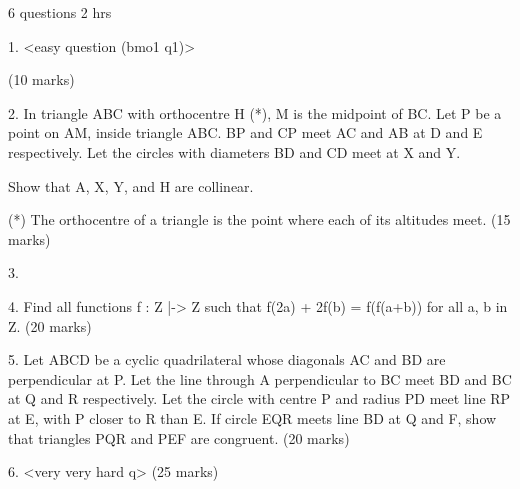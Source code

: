 6 questions
2 hrs


1. <easy question (bmo1 q1)>

(10 marks)




2.
In triangle ABC with orthocentre H (*), M is the midpoint of BC. Let P be a point on AM, inside triangle ABC.
BP and CP meet AC and AB at D and E respectively. Let the circles with diameters BD and CD meet at X and Y.

Show that A, X, Y, and H are collinear.

(*) The orthocentre of a triangle is the point where each of its altitudes meet.
(15 marks)



3.




4.
Find all functions f : Z |-> Z such that
f(2a) + 2f(b) = f(f(a+b))
for all a, b in Z.
(20 marks)



5.
Let ABCD be a cyclic quadrilateral whose diagonals AC and BD are perpendicular at P. Let the line through A perpendicular to BC meet BD and BC at Q and R respectively.
Let the circle with centre P and radius PD meet line RP at E, with P closer to R than E. If circle EQR meets line BD at Q and F, show that triangles PQR and PEF are congruent.
(20 marks)



6.
<very very hard q>
(25 marks)